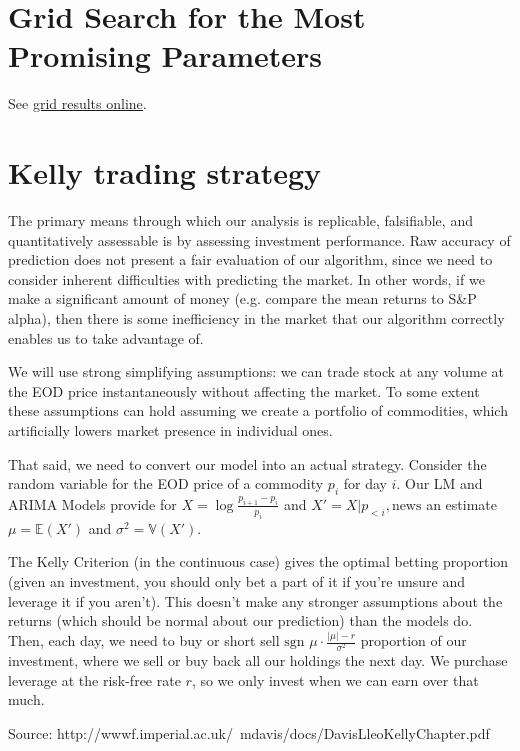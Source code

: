 \documentclass{article}
\begin{document}
	\section{Grid Search for the Most Promising Parameters}
	
        See \hyperref[http://tiny.cc/grid_search_results]{{\color{blue} \underline{grid results online}}}.


	\section{Kelly trading strategy}
	
The primary means through which our analysis is replicable, falsifiable, and quantitatively assessable is by assessing investment performance. Raw accuracy of prediction does not present a fair evaluation of our algorithm, since we need to consider inherent difficulties with predicting the market. In other words, if we make a significant amount of money (e.g. compare the mean returns to S\&P alpha), then there is some inefficiency in the market that our algorithm correctly enables us to take advantage of.

We will use strong simplifying assumptions: we can trade stock at any volume at the EOD price instantaneously without affecting the market. To some extent these assumptions can hold assuming we create a portfolio of commodities, which artificially lowers market presence in individual ones.

That said, we need to convert our model into an actual strategy. Consider the random variable for the EOD price of a commodity $p_i$ for day $i$. Our LM and ARIMA Models provide for $X = \log\frac{p_{i+1}-p_i}{p_i}$ and $X'=X|p_{<i},\text{news}$ an estimate $\mu=\mathbb{E}(X')$ and $\sigma^2=\mathbb{V}(X')$.

The Kelly Criterion (in the continuous case) gives the optimal betting proportion (given an investment, you should only bet a part of it if you're unsure and leverage it if you aren't). This doesn't make any stronger assumptions about the returns (which should be normal about our prediction) than the models do. Then, each day, we need to buy or short sell $\text{sgn }\mu\cdot\frac{\left|\mu\right|-r}{\sigma^2}$ proportion of our investment, where we sell or buy back all our holdings the next day. We purchase leverage at the risk-free rate $r$, so we only invest when we can earn over that much.

Source: http://wwwf.imperial.ac.uk/~mdavis/docs/DavisLleoKellyChapter.pdf
\end{document}
